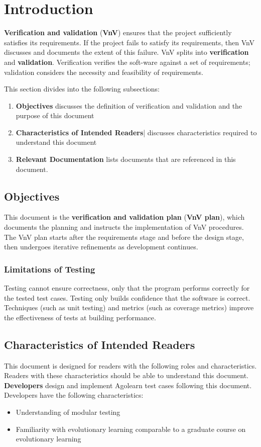 \documentclass[12pt, titlepage]{article}
\begin{document}
\section{Introduction}

\textbf{Verification and validation} (\textbf{VnV}) ensures that the project sufficiently satisfies its requirements. If the project fails to satisfy its requirements, then VnV discusses and documents the extent of this failure.
VnV splits into \textbf{verification} and \textbf{validation}. Verification verifies the soft-ware against a set of requirements; validation considers the necessity and feasibility of requirements.

This section divides into the following subsections:
\begin{enumerate}
  \item \textbf{Objectives} discusses the definition of verification and validation and the purpose of this document
  \item \textbf{Characteristics of Intended Readers}| discusses characteristics required to understand this document
  \item \textbf{Relevant Documentation} lists documents that are referenced in this document.
\end{enumerate}

\subsection{Objectives}
\label{subsec:objectives}
This document is the \textbf{verification and validation plan} (\textbf{VnV plan}), which documents the planning and instructs the implementation of VnV procedures. The VnV plan starts after the requirements stage and before the design stage, then undergoes iterative refinements as development continues.


\subsubsection{Limitations of Testing}
\label{subsubsec:limitations}
Testing cannot ensure correctness, only that the program performs correctly for the tested test cases. Testing only builds confidence that the software is correct. Techniques (such as unit testing) and metrics (such as coverage metrics) improve the effectiveness of tests at building performance.

\subsection{Characteristics of Intended Readers}
\label{subsec:characteristics}
This document is designed for readers with the following roles and characteristics. Readers with these characteristics should be able to understand this document.
\textbf{Developers} design and implement Agolearn test cases following this document. Developers have the following characteristics:
\begin{itemize}
  \item	Understanding of modular testing
  \item	Familiarity with evolutionary learning comparable to a graduate course on evolutionary learning
\end{itemize}
\end{document}
